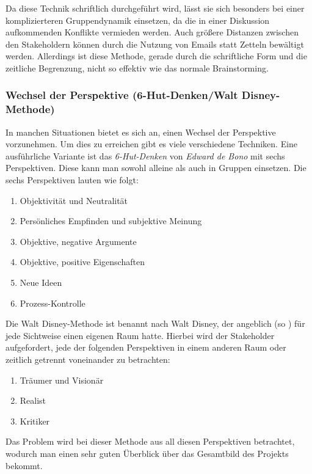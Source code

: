Da diese Technik schriftlich durchgeführt wird, lässt sie sich besonders bei einer komplizierteren Gruppendynamik einsetzen, da die in einer Diskussion aufkommenden Konflikte vermieden werden. Auch größere Distanzen zwischen den Stakeholdern können durch die Nutzung von Emails statt Zetteln bewältigt werden. Allerdings ist diese Methode, gerade durch die schriftliche Form und die zeitliche Begrenzung, nicht so effektiv wie das normale Brainstorming.

\subsubsection{Wechsel der Perspektive (6-Hut-Denken/Walt Disney-Methode)}
In manchen Situationen bietet es sich an, einen Wechsel der Perspektive vorzunehmen. Um dies zu erreichen gibt es viele verschiedene Techniken. Eine ausführliche Variante ist das \textit{6-Hut-Denken} von \textit{Edward de Bono} mit sechs Perspektiven. Diese kann man sowohl alleine als auch in Gruppen einsetzen. Die sechs Perspektiven lauten wie folgt:
\begin{enumerate}
  \setlength\itemsep{-4pt}
\item Objektivität und Neutralität
\item Persönliches Empfinden und subjektive Meinung
\item Objektive, negative Argumente
\item Objektive, positive Eigenschaften
\item Neue Ideen
\item Prozess-Kontrolle
\end{enumerate} 

Die Walt Disney-Methode ist benannt nach Walt Disney, der angeblich (so \cite{Rupp2}) für jede Sichtweise einen eigenen Raum hatte.
Hierbei wird der Stakeholder aufgefordert, jede der folgenden Perspektiven in einem anderen Raum oder zeitlich getrennt voneinander zu betrachten:

\begin{enumerate}
  \setlength\itemsep{-4pt}
\item Träumer und Visionär
\item Realist
\item Kritiker
\end{enumerate} 

Das Problem wird bei dieser Methode aus all diesen Perspektiven betrachtet, wodurch man einen sehr guten Überblick über das Gesamtbild des Projekts bekommt.\\

